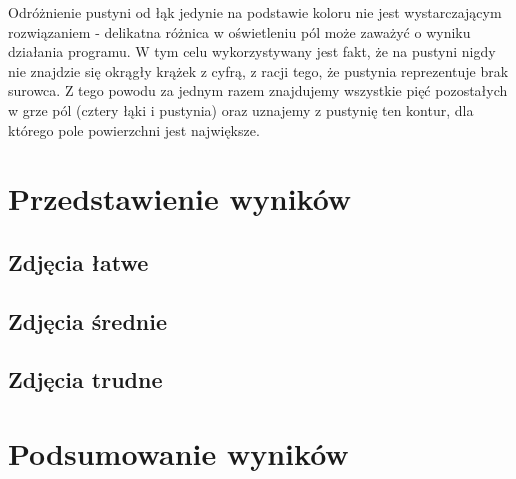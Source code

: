 \documentclass[a4paper]{article}
\begin{document}
Odróżnienie pustyni od łąk jedynie na podstawie koloru nie jest wystarczającym rozwiązaniem - delikatna różnica w oświetleniu pól może zaważyć o wyniku działania programu. W tym celu wykorzystywany jest fakt, że na pustyni nigdy nie znajdzie się okrągły krążek z cyfrą, z racji tego, że pustynia reprezentuje brak surowca. Z tego powodu za jednym razem znajdujemy wszystkie pięć pozostałych w grze pól (cztery łąki i pustynia) oraz uznajemy z pustynię ten kontur, dla którego pole powierzchni jest największe.
      
\section{Przedstawienie wyników}
    \subsection{Zdjęcia łatwe}
    \subsection{Zdjęcia średnie}
    \subsection{Zdjęcia trudne}
\section{Podsumowanie wyników}
\end{document}
